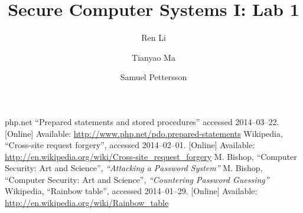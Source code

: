 \documentclass{article}
\title{\textbf{Secure Computer Systems I: Lab 1}}
\author{Ren Li \and Tianyao Ma \and Samuel Pettersson}
\begin{document}
\maketitle



\begin{thebibliography}{9}
  php.net
  ``Prepared statements and stored procedures''
  accessed 2014--03--22.
  [Online]
  Available: \url{http://www.php.net/pdo.prepared-statements}
  Wikipedia,
  ``Cross-site request forgery'',
  accessed 2014--02--01.
  [Online]
  Available: \url{http://en.wikipedia.org/wiki/Cross-site_request_forgery}
  M. Bishop,
  ``Computer Security: Art and Science'',
  \textit{``Attacking a Password System''}
  M. Bishop,
  ``Computer Security: Art and Science'',
  \textit{``Countering Password Guessing''}
  Wikipedia,
  ``Rainbow table'',
  accessed 2014--01--29.
  [Online]
  Available: \url{http://en.wikipedia.org/wiki/Rainbow_table}
\end{thebibliography}
\end{document}
